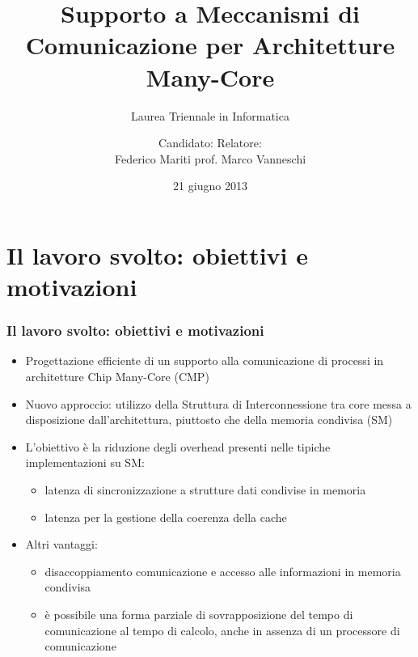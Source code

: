 \documentclass{beamer}
\subtitle{\vspace{6.5mm} {\small Laurea Triennale in Informatica}}
\title[Supporto a Meccanismi di Comunicazione per archit. Many-Core]{Supporto a Meccanismi di Comunicazione per Architetture Many-Core}
\author[Federico Mariti]{{\small Candidato:}\hspace{18ex}  {\small Relatore:} \\ \hspace{3ex}Federico Mariti \hspace{8ex} prof. Marco Vanneschi}
\date[]{21 giugno 2013}
\begin{document}
\maketitle

\section{Il lavoro svolto: obiettivi e motivazioni}

\begin{frame}
  \frametitle{Il lavoro svolto: obiettivi e motivazioni}
  \begin{itemize}
  \item Progettazione efficiente di un supporto alla comunicazione di processi in architetture Chip Many-Core (CMP)
  \item Nuovo approccio: utilizzo della Struttura di Interconnessione tra core messa a disposizione dall'architettura, piuttosto che della memoria condivisa (SM)
  \item L'obiettivo \`e la riduzione degli overhead presenti nelle tipiche implementazioni su SM:
    \begin{itemize}
    \item latenza di sincronizzazione a strutture dati condivise in memoria
    \item latenza per la gestione della coerenza della cache
    \end{itemize}
  \item Altri vantaggi:
    \begin{itemize}
    \item disaccoppiamento comunicazione e accesso alle informazioni in memoria condivisa
    \item \`e possibile una forma parziale di sovrapposizione del tempo di comunicazione al tempo di calcolo, anche in assenza di un processore di comunicazione
    \end{itemize}
  \end{itemize}
    
    

\end{frame}
\end{document}

